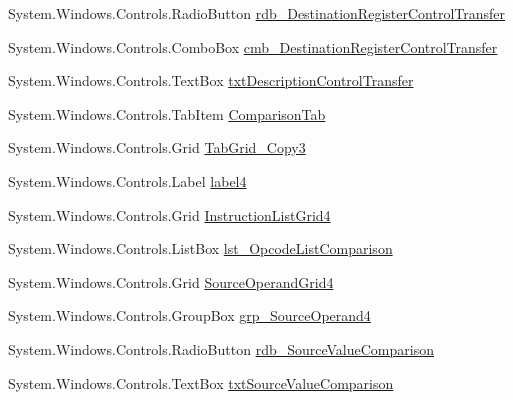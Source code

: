\begin{DoxyCompactItemize}
\item 
System.\+Windows.\+Controls.\+Radio\+Button \hyperlink{class_c_p_u___o_s___simulator_1_1_instructions_window_a4911636b6e093aa89155a0f5db4b3118}{rdb\+\_\+\+Destination\+Register\+Control\+Transfer}
\item 
System.\+Windows.\+Controls.\+Combo\+Box \hyperlink{class_c_p_u___o_s___simulator_1_1_instructions_window_a9017d3508e5dde75eafec25e94611c97}{cmb\+\_\+\+Destination\+Register\+Control\+Transfer}
\item 
System.\+Windows.\+Controls.\+Text\+Box \hyperlink{class_c_p_u___o_s___simulator_1_1_instructions_window_af8667a9cb444eb6aaa84349fe194b853}{txt\+Description\+Control\+Transfer}
\item 
System.\+Windows.\+Controls.\+Tab\+Item \hyperlink{class_c_p_u___o_s___simulator_1_1_instructions_window_ab807abcf9c3955ae2ff78e1d667820b2}{Comparison\+Tab}
\item 
System.\+Windows.\+Controls.\+Grid \hyperlink{class_c_p_u___o_s___simulator_1_1_instructions_window_a8a50487f6e6acca8a58ffe218e32abe2}{Tab\+Grid\+\_\+\+Copy3}
\item 
System.\+Windows.\+Controls.\+Label \hyperlink{class_c_p_u___o_s___simulator_1_1_instructions_window_a6d028c99fa713c891d86c07ef46f083b}{label4}
\item 
System.\+Windows.\+Controls.\+Grid \hyperlink{class_c_p_u___o_s___simulator_1_1_instructions_window_a9cdd58a2e38d3f0b047b6eb64b43ea03}{Instruction\+List\+Grid4}
\item 
System.\+Windows.\+Controls.\+List\+Box \hyperlink{class_c_p_u___o_s___simulator_1_1_instructions_window_ae47949fa5657e55f8acd8e5b9cd204c0}{lst\+\_\+\+Opcode\+List\+Comparison}
\item 
System.\+Windows.\+Controls.\+Grid \hyperlink{class_c_p_u___o_s___simulator_1_1_instructions_window_ac28180235c174caa7a2870120a9258bb}{Source\+Operand\+Grid4}
\item 
System.\+Windows.\+Controls.\+Group\+Box \hyperlink{class_c_p_u___o_s___simulator_1_1_instructions_window_a0efec3cdad460e3596a699716e0a24e9}{grp\+\_\+\+Source\+Operand4}
\item 
System.\+Windows.\+Controls.\+Radio\+Button \hyperlink{class_c_p_u___o_s___simulator_1_1_instructions_window_a6232aa7952b3d4ea71c55eb14267f188}{rdb\+\_\+\+Source\+Value\+Comparison}
\item 
System.\+Windows.\+Controls.\+Text\+Box \hyperlink{class_c_p_u___o_s___simulator_1_1_instructions_window_a8dd17881b7fd4e1923899b5bcae171fc}{txt\+Source\+Value\+Comparison}

\end{DoxyCompactItemize}
